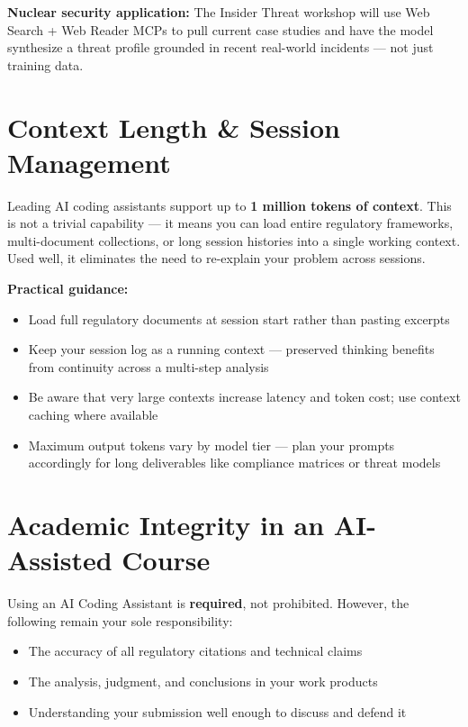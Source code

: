 \documentclass[9pt]{extarticle}
\begin{document}
\textbf{Nuclear security application:} The Insider Threat workshop will use Web
Search + Web Reader MCPs to pull current case studies and have the model
synthesize a threat profile grounded in recent real-world incidents --- not
just training data.

\section*{Context Length \& Session Management}

Leading AI coding assistants support up to \textbf{1 million tokens of context}. This is not a
trivial capability --- it means you can load entire regulatory frameworks,
multi-document collections, or long session histories into a single working
context. Used well, it eliminates the need to re-explain your problem across
sessions.

\medskip

\textbf{Practical guidance:}
\begin{itemize}
    \item Load full regulatory documents at session start rather than pasting excerpts
    \item Keep your session log as a running context --- preserved thinking benefits
          from continuity across a multi-step analysis
    \item Be aware that very large contexts increase latency and token cost; use
          context caching where available
    \item Maximum output tokens vary by model tier --- plan your prompts accordingly
          for long deliverables like compliance matrices or threat models
\end{itemize}

\section*{Academic Integrity in an AI-Assisted Course}

Using an AI Coding Assistant is \textbf{required}, not prohibited. However, the
following remain your sole responsibility:

\begin{itemize}
    \item The accuracy of all regulatory citations and technical claims
    \item The analysis, judgment, and conclusions in your work products
    \item Understanding your submission well enough to discuss and defend it
\end{itemize}
\end{document}
